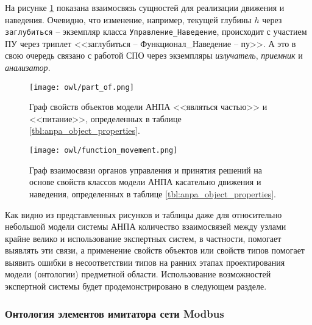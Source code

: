 На рисунке \ref{fig:function_movement} показана взаимосвязь сущностей для реализации движения и наведения.
Очевидно, что изменение, например, текущей глубины $h$ через \texttt{заглубиться} -- экземпляр класса \texttt{Управление\_Наведение},
происходит с участием ПУ через триплет <<заглубиться -- Функционал\_Наведение -- пу>>.
А это в свою очередь связано с работой СПО через экземпляры \textit{излучатель}, \textit{приемник} и \textit{анализатор}.

\begin{center}
    \begin{figure}[hb!]
        \texttt{[image: owl/part\_of.png]}
        \caption{Граф свойств объектов модели АНПА <<являться частью>> и  <<питание>>, определенных в таблице \ref{tbl:anpa_object_properties}.}\label{fig:part_of}
        \texttt{[image: owl/function\_movement.png]}
        \caption{Граф взаимосвязи органов управления и принятия решений на основе свойств классов модели АНПА касательно движения и наведения,
            определенных в таблице \ref{tbl:anpa_object_properties}.}\label{fig:function_movement}
    \end{figure}
\end{center}

Как видно из представленных рисунков и таблицы даже для относительно небольшой модели системы АНПА количество взаимосвязей между узлами
крайне велико и использование экспертных систем, в частности, \protege помогает выявлять эти связи,
а применение свойств объектов или свойств типов помогает выявить ошибки в несоответствии типов на ранних этапах проектирования модели (онтологии)
предметной области. Использование возможностей экспертной системы будет продемонстрировано в следующем разделе.


\subsubsection{Онтология элементов имитатора сети Modbus}


